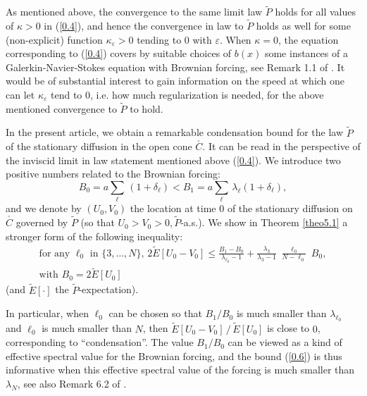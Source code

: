 \documentclass[12pt,leqno]{article}
\def\dis{\displaystyle}
\def\ve{\varepsilon}
\def\wt{\widetilde}
\begin{document}
\medskip
As mentioned above, the convergence to the same limit law $\wt{P}$ holds for all values of $\kappa > 0$ in (\ref{0.4}), and hence the convergence in law to $\wt{P}$ holds as well for some (non-explicit) function $\kappa_\ve > 0$ tending to $0$ with $\ve$. When $\kappa = 0$,  the equation corresponding to (\ref{0.4}) covers by suitable choices of $b(x)$ some instances of a Galerkin-Navier-Stokes equation with Brownian forcing, see Remark 1.1 of \cite{SzniWidm26b}. It would be of substantial interest to gain information on the speed at which one can let $\kappa_\ve$ tend to $0$, i.e. how much regularization is needed, for the above mentioned convergence to $\wt{P}$ to hold.

\medskip
In the present article, we obtain a remarkable condensation bound for the law $\wt{P}$ of the stationary diffusion in the open cone $\stackrel{_\circ}{C}$. It can be read in the perspective of the inviscid limit in law statement mentioned above (\ref{0.4}). We introduce two positive numbers related to the Brownian forcing:
\begin{equation}\label{0.5}
B_0 = a \sum_\ell \, (1 + \delta_\ell) < B_1 = a \sum_\ell \, \lambda_\ell (1 + \delta_\ell),
\end{equation}    
and we denote by $(U_0, V_0)$ the location at time $0$ of the stationary diffusion on $\stackrel{_\circ}{C}$ governed by $\wt{P}$ (so that $U_0 > V_0 > 0, \wt{P}$-a.s.). We show in Theorem \ref{theo5.1} a stronger form of the following inequality:
\begin{equation}\label{0.6}
\begin{array}{l}
\mbox{for any $\ell_0$ in $\{3, \dots, N\}$, $2 \wt{E} [ U_0 - V_0] \le \dis\frac{B_1 - B_0}{\lambda_{\ell_0} - 1} + \dis\frac{\lambda_3}{\lambda_3 - 1} \; \dis\frac{\ell_0}{N- \ell_0} \; B_0$}, 
\\[1ex]
\mbox{with $B_0 = 2 \wt{E} [U_0]$}
\end{array}
\end{equation}
(and $\wt{E} [ \cdot]$ the $\wt{P}$-expectation).

\bigskip
In particular, when $\ell_0$ can be chosen so that $B_1 / B_0$ is much smaller than $\lambda_{\ell_0}$ and $\ell_0$ is much smaller than $N$, then $\wt{E} [U_0 - V_0] \,/ \, \wt{E}[U_0]$ is close to $0$, corresponding to ``condensation''. The value $B_1 / B_0$ can be viewed as a kind of effective spectral value for the Brownian forcing, and the bound (\ref{0.6}) is thus informative when this effective spectral value of the forcing is much smaller than $\lambda_N$, see also Remark 6.2 of \cite{SzniWidm26b}.
\end{document}
